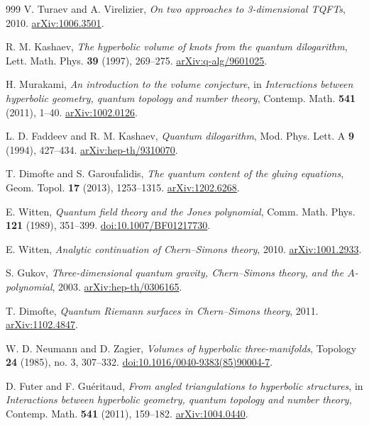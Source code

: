 \documentclass[11pt,a4paper]{article}
\numberwithin{equation}{section}
\theoremstyle{definition}
\theoremstyle{remark}
\begin{document}
\begin{thebibliography}{999}
V. Turaev and A. Virelizier,
\emph{On two approaches to 3-dimensional TQFTs}, 2010.
\href{https://arxiv.org/abs/1006.3501}{arXiv:1006.3501}.

R. M. Kashaev,
\emph{The hyperbolic volume of knots from the quantum dilogarithm},
Lett. Math. Phys. \textbf{39} (1997), 269--275.
\href{https://arxiv.org/abs/q-alg/9601025}{arXiv:q-alg/9601025}.

H. Murakami,
\emph{An introduction to the volume conjecture},
in \emph{Interactions between hyperbolic geometry, quantum topology
and number theory}, Contemp. Math. \textbf{541} (2011), 1--40.
\href{https://arxiv.org/abs/1002.0126}{arXiv:1002.0126}.

L. D. Faddeev and R. M. Kashaev,
\emph{Quantum dilogarithm},
Mod. Phys. Lett. A \textbf{9} (1994), 427--434.
\href{https://arxiv.org/abs/hep-th/9310070}{arXiv:hep-th/9310070}.

T. Dimofte and S. Garoufalidis,
\emph{The quantum content of the gluing equations},
Geom. Topol. \textbf{17} (2013), 1253--1315.
\href{https://arxiv.org/abs/1202.6268}{arXiv:1202.6268}.

E. Witten,
\emph{Quantum field theory and the Jones polynomial},
Comm. Math. Phys. \textbf{121} (1989), 351--399.
\href{https://doi.org/10.1007/BF01217730}{doi:10.1007/BF01217730}.

E. Witten,
\emph{Analytic continuation of Chern--Simons theory}, 2010.
\href{https://arxiv.org/abs/1001.2933}{arXiv:1001.2933}.

S. Gukov,
\emph{Three-dimensional quantum gravity, Chern--Simons theory,
and the $A$-polynomial}, 2003.
\href{https://arxiv.org/abs/hep-th/0306165}{arXiv:hep-th/0306165}.

T. Dimofte,
\emph{Quantum Riemann surfaces in Chern--Simons theory}, 2011.
\href{https://arxiv.org/abs/1102.4847}{arXiv:1102.4847}.

W. D. Neumann and D. Zagier,
\emph{Volumes of hyperbolic three-manifolds},
Topology \textbf{24} (1985), no. 3, 307--332.
\href{https://doi.org/10.1016/0040-9383(85)90004-7}{doi:10.1016/0040-9383(85)90004-7}.

D. Futer and F. Gu\'eritaud,
\emph{From angled triangulations to hyperbolic structures},
in \emph{Interactions between hyperbolic geometry, quantum topology
and number theory}, Contemp. Math. \textbf{541} (2011), 159--182.
\href{https://arxiv.org/abs/1004.0440}{arXiv:1004.0440}.


\end{thebibliography}
\end{document}

